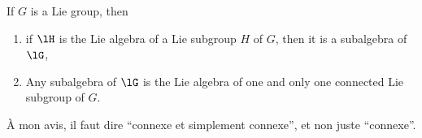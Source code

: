 \begin{theorem}		\label{ThoSubGpSubAlg}		\label{tho:gp_alg}
If $G$ is a Lie group, then
\begin{enumerate}
\item\label{ThoSubGpSubAlgi} if $\lH$ is the Lie algebra of a Lie subgroup $H$ of $G$, then it is a subalgebra of $\lG$,
\item Any subalgebra of $\lG$ is the Lie algebra of one and only one connected Lie subgroup of $G$.
\end{enumerate}

\begin{probleme}
À mon avis, il faut dire ``connexe et simplement connexe'', et non juste ``connexe''.
\end{probleme}

\end{theorem}
